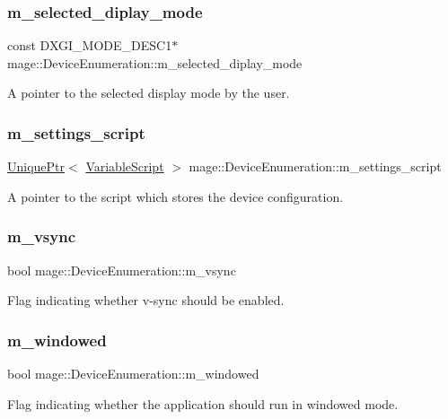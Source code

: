 \subsubsection{\texorpdfstring{m\+\_\+selected\+\_\+diplay\+\_\+mode}{m\_selected\_diplay\_mode}}
{\footnotesize\ttfamily const D\+X\+G\+I\+\_\+\+M\+O\+D\+E\+\_\+\+D\+E\+S\+C1$\ast$ mage\+::\+Device\+Enumeration\+::m\+\_\+selected\+\_\+diplay\+\_\+mode\hspace{0.3cm}{\ttfamily [protected]}}

A pointer to the selected display mode by the user. \hypertarget{classmage_1_1_device_enumeration_ab6a58580daf27bff07ba7df428833616}{}\label{classmage_1_1_device_enumeration_ab6a58580daf27bff07ba7df428833616} 
\subsubsection{\texorpdfstring{m\+\_\+settings\+\_\+script}{m\_settings\_script}}
{\footnotesize\ttfamily \hyperlink{namespacemage_a8c307fbcc33bce9b7f2aa4c26c3b95cf}{Unique\+Ptr}$<$ \hyperlink{classmage_1_1_variable_script}{Variable\+Script} $>$ mage\+::\+Device\+Enumeration\+::m\+\_\+settings\+\_\+script\hspace{0.3cm}{\ttfamily [protected]}}

A pointer to the script which stores the device configuration. \hypertarget{classmage_1_1_device_enumeration_a027220f50649c40785e2b918411adfad}{}\label{classmage_1_1_device_enumeration_a027220f50649c40785e2b918411adfad} 
\subsubsection{\texorpdfstring{m\+\_\+vsync}{m\_vsync}}
{\footnotesize\ttfamily bool mage\+::\+Device\+Enumeration\+::m\+\_\+vsync\hspace{0.3cm}{\ttfamily [protected]}}

Flag indicating whether v-\/sync should be enabled. \hypertarget{classmage_1_1_device_enumeration_a277c5dae7861c9cb1175192a61274cc9}{}\label{classmage_1_1_device_enumeration_a277c5dae7861c9cb1175192a61274cc9} 
\subsubsection{\texorpdfstring{m\+\_\+windowed}{m\_windowed}}
{\footnotesize\ttfamily bool mage\+::\+Device\+Enumeration\+::m\+\_\+windowed\hspace{0.3cm}{\ttfamily [protected]}}

Flag indicating whether the application should run in windowed mode. 